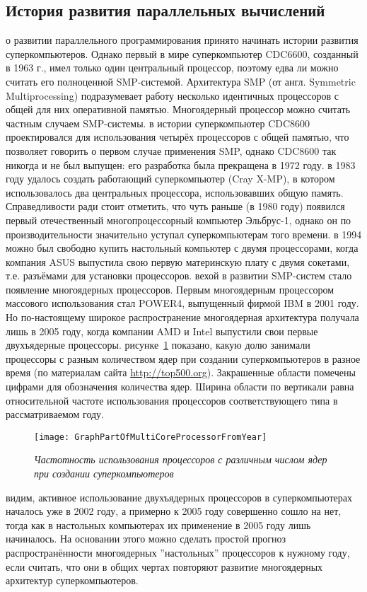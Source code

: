 { %
	\subsection{История развития параллельных вычислений}
	 о развитии параллельного программирования принято начинать истории развития суперкомпьютеров. Однако первый в мире суперкомпьютер CDC6600, созданный в 1963 г., имел только один центральный процессор, поэтому едва ли можно считать его полноценной SMP-системой. Архитектура SMP (от англ. Symmetric Multiprocessing) подразумевает работу несколько идентичных процессоров с общей для них оперативной памятью. Многоядерный процессор можно считать частным случаем SMP-системы.
	 в истории суперкомпьютер CDC8600 проектировался для использования четырёх процессоров с общей памятью, что позволяет говорить о первом случае применения SMP, однако CDC8600 так никогда и не был выпущен: его разработка была прекращена в 1972 году. 
	 в 1983 году удалось создать работающий суперкомпьютер (Cray X-MP), в котором использовалось два центральных процессора, использовавших общую память. Справедливости ради стоит отметить, что чуть раньше (в 1980 году) появился первый отечественный многопроцессорный компьютер Эльбрус-1, однако он по производительности значительно уступал суперкомпьютерам того времени.
	 в 1994 можно был свободно купить настольный компьютер с двумя процессорами, когда компания ASUS выпустила свою первую материнскую плату с двумя сокетами, т.е. разъёмами для установки процессоров.
	 вехой в развитии SMP-систем стало появление многоядерных процессоров. Первым многоядерным процессором массового использования стал POWER4, выпущенный фирмой IBM в 2001 году. Но по-настоящему широкое распространение многоядерная архитектура получала лишь в 2005 году, когда компании AMD и Intel выпустили свои первые двухъядерные процессоры.  
	 рисунке~\ref{GraphPartOfMultiCoreProcessorFromYear:image} показано, какую долю занимали процессоры с разным количеством ядер при создании суперкомпьютеров в разное время (по материалам сайта \url{http://top500.org}). Закрашенные области помечены цифрами для обозначения количества ядер. Ширина области по вертикали равна относительной частоте использования процессоров соответствующего типа в рассматриваемом году.
	\begin{figure}[H]
		\texttt{[image: GraphPartOfMultiCoreProcessorFromYear]}
		\caption{\textit{Частотность использования процессоров с различным числом ядер при создании суперкомпьютеров}}
		\label{GraphPartOfMultiCoreProcessorFromYear:image}
	\end{figure}
	 видим, активное использование двухъядерных процессоров в суперкомпьютерах началось уже в 2002 году, а примерно к 2005 году совершенно сошло на нет, тогда как в настольных компьютерах их применение в 2005 году лишь начиналось. На основании этого можно сделать простой прогноз распространённости многоядерных ''настольных'' процессоров к нужному году, если считать, что они в общих чертах повторяют развитие многоядерных архитектур суперкомпьютеров.
	\par
}